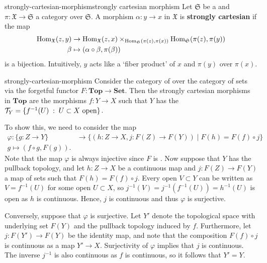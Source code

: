 \begin{topic}{strongly-cartesian-morphism}{strongly cartesian morphism}
    Let $\mathfrak{S}$ be a  and $\pi : \mathfrak{X} \to \mathfrak{S}$ a category over $\mathfrak{S}$. A morphism $\alpha : y \to x$ in $\mathfrak{X}$ is \textbf{strongly cartesian} if the map
    \[ \begin{aligned}
        \text{Hom}_\mathfrak{X}(z, y) &\to \text{Hom}_\mathfrak{X}(z, x) \times_{\text{Hom}_\mathfrak{S}(\pi(z), \pi(x))} \text{Hom}_\mathfrak{S}(\pi(z), \pi(y)) \\
        \beta &\mapsto (\alpha \circ \beta, \pi(\beta))
    \end{aligned} \]
    is a bijection. Intuitively, $y$ acts like a `fiber product' of $x$ and $\pi(y)$ over $\pi(x)$.
\end{topic}

\begin{example}{strongly-cartesian-morphism}
    Consider the category of  over the category of sets via the forgetful functor $F : \textbf{Top} \to \textbf{Set}$. Then the strongly cartesian morphisms in $\textbf{Top}$ are the morphisms $f : Y \to X$ such that $Y$ has the  $\mathcal{T}_Y = \{ f^{-1}(U) \;:\; U \subset X \textup{ open} \}$.
    
    To show this, we need to consider the map
    \[ \begin{aligned}
        \varphi : \{ g : Z \to Y \} &\to \{ (h : Z \to X, j : F(Z) \to F(Y)) \;|\; F(h) = F(f) \circ j \} \\
        g \mapsto (f \circ g, F(g)) .
    \end{aligned} \]
    Note that the map $\varphi$ is always injective since $F$ is . Now suppose that $Y$ has the pullback topology, and let $h : Z \to X$ be a continuous map and $j : F(Z) \to F(Y)$ a map of sets such that $F(h) = F(f) \circ j$. Every open $V \subset Y$ can be written as $V = f^{-1}(U)$ for some open $U \subset X$, so $j^{-1}(V) = j^{-1}(f^{-1}(U)) = h^{-1}(U)$ is open as $h$ is continuous. Hence, $j$ is continuous and thus $\varphi$ is surjective.
    
    Conversely, suppose that $\varphi$ is surjective. Let $Y'$ denote the topological space with underlying set $F(Y)$ and the pullback topology induced by $f$. Furthermore, let $j : F(Y') \to F(Y)$ be the identity map, and note that the composition $F(f) \circ j$ is continuous as a map $Y' \to X$. Surjectivity of $\varphi$ implies that $j$ is continuous. The inverse $j^{-1}$ is also continuous as $f$ is continuous, so it follows that $Y' = Y$.
\end{example}

